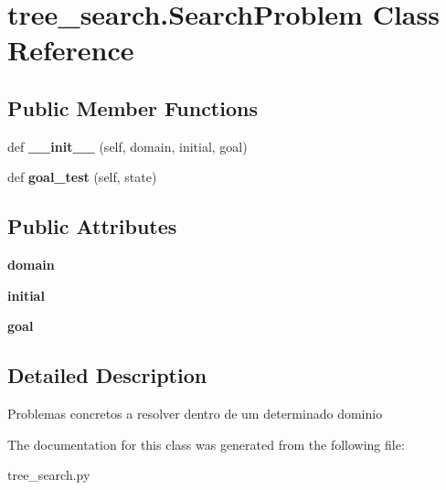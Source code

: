 \hypertarget{classtree__search_1_1_search_problem}{}\section{tree\+\_\+search.\+Search\+Problem Class Reference}
\label{classtree__search_1_1_search_problem}
\subsection*{Public Member Functions}
\begin{DoxyCompactItemize}
\item 
\mbox{\label{classtree__search_1_1_search_problem_a1533ce4d38ee74cd206ca208543ab965}} 
def {\bfseries \+\_\+\+\_\+init\+\_\+\+\_\+} (self, domain, initial, goal)
\item 
\mbox{\label{classtree__search_1_1_search_problem_a80ba97430fcba891f2937988aa3bd473}} 
def {\bfseries goal\+\_\+test} (self, state)
\end{DoxyCompactItemize}
\subsection*{Public Attributes}
\begin{DoxyCompactItemize}
\item 
\mbox{\label{classtree__search_1_1_search_problem_af616370e825a290799cb5e506f0907ab}} 
{\bfseries domain}
\item 
\mbox{\label{classtree__search_1_1_search_problem_ad2cb7f9b07e9f0f656be76f7c9213e98}} 
{\bfseries initial}
\item 
\mbox{\label{classtree__search_1_1_search_problem_a119a8410f31c9e61035960fffdae6c10}} 
{\bfseries goal}
\end{DoxyCompactItemize}


\subsection{Detailed Description}
\begin{DoxyVerb}Problemas concretos a resolver dentro de um determinado dominio\end{DoxyVerb}
 

The documentation for this class was generated from the following file\+:\begin{DoxyCompactItemize}
\item 
tree\+\_\+search.\+py\end{DoxyCompactItemize}
